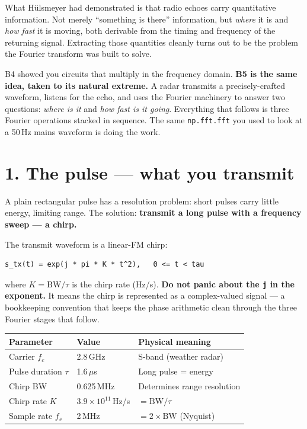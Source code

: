 \documentclass[11pt,a4paper,openany]{book}
\begin{document}
What H\"{u}lsmeyer had demonstrated is that radio echoes carry quantitative
information. Not merely ``something is there'' information, but \emph{where}
it is and \emph{how fast} it is moving, both derivable from the timing and
frequency of the returning signal. Extracting those quantities cleanly turns
out to be the problem the Fourier transform was built to solve.

B4 showed you circuits that multiply in the frequency domain. \textbf{B5 is
the same idea, taken to its natural extreme.} A radar transmits a
precisely-crafted waveform, listens for the echo, and uses the Fourier
machinery to answer two questions: \emph{where is it} and \emph{how fast is
it going}. Everything that follows is three Fourier operations stacked in
sequence. The same \texttt{np.fft.fft} you used to look at a 50\,Hz mains
waveform is doing the work.

\section{1. The pulse --- what you transmit}

A plain rectangular pulse has a resolution problem: short pulses carry little
energy, limiting range. The solution: \textbf{transmit a long pulse with a
frequency sweep --- a chirp.}

The transmit waveform is a linear-FM chirp:
\begin{lstlisting}[style=shaddata]
s_tx(t) = exp(j * pi * K * t^2),   0 <= t < tau
\end{lstlisting}

where $K = \mathrm{BW}/\tau$ is the chirp rate (Hz/s). \textbf{Do not panic
about the \texttt{j} in the exponent.} It means the chirp is represented as a
complex-valued signal --- a bookkeeping convention that keeps the phase
arithmetic clean through the three Fourier stages that follow.

\medskip
\begin{longtable}{p{3.0cm}p{2.0cm}p{8.0cm}}
\toprule
\textbf{Parameter} & \textbf{Value} & \textbf{Physical meaning} \\
\midrule
\endhead
Carrier $f_c$ & 2.8\,GHz & S-band (weather radar) \\
Pulse duration $\tau$ & 1.6\,$\mu$s & Long pulse = energy \\
Chirp BW & 0.625\,MHz & Determines range resolution \\
Chirp rate $K$ & $3.9 \times 10^{11}$\,Hz/s & $= \mathrm{BW}/\tau$ \\
Sample rate $f_s$ & 2\,MHz & $= 2 \times \mathrm{BW}$ (Nyquist) \\
\bottomrule
\end{longtable}
\medskip
\end{document}
